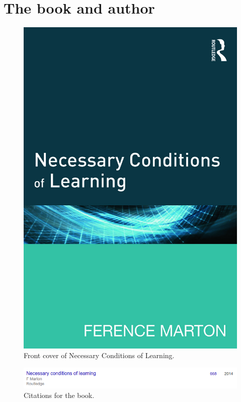 \mode*

\section[Book and author]{The book and author}

\begin{frame}
  \begin{figure}
    \includegraphics[height=0.8\textheight]{fig/book.jpg}
    \caption{Front cover of Necessary Conditions of Learning.}
  \end{figure}
\end{frame}

\begin{frame}
  \begin{figure}
    \includegraphics[width=\columnwidth]{fig/necessary-conditions-citations.png}
    \caption{Citations for the book.}
  \end{figure}
\end{frame}

